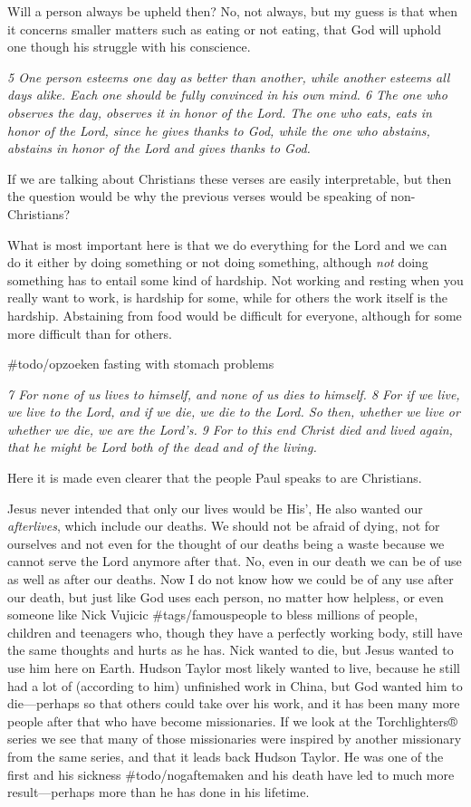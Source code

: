 Will a person always be upheld then? No, not always, but my guess is
that when it concerns smaller matters such as eating or not eating, that
God will uphold one though his struggle with his conscience.

\emph{5 One person esteems one day as better than another, while another
esteems all days alike. Each one should be fully convinced in his own
mind. 6 The one who observes the day, observes it in honor of the Lord.
The one who eats, eats in honor of the Lord, since he gives thanks to
God, while the one who abstains, abstains in honor of the Lord and gives
thanks to God.}

If we are talking about Christians these verses are easily
interpretable, but then the question would be why the previous verses
would be speaking of non-Christians?

What is most important here is that we do everything for the Lord and we
can do it either by doing something or not doing something, although
\emph{not} doing something has to entail some kind of hardship. Not
working and resting when you really want to work, is hardship for some,
while for others the work itself is the hardship. Abstaining from food
would be difficult for everyone, although for some more difficult than
for others.

\#todo/opzoeken fasting with stomach problems

\emph{7 For none of us lives to himself, and none of us dies to himself.
8 For if we live, we live to the Lord, and if we die, we die to the
Lord. So then, whether we live or whether we die, we are the Lord's. 9
For to this end Christ died and lived again, that he might be Lord both
of the dead and of the living.}

Here it is made even clearer that the people Paul speaks to are
Christians.

Jesus never intended that only our lives would be His', He also wanted
our \emph{afterlives}, which include our deaths. We should not be afraid
of dying, not for ourselves and not even for the thought of our deaths
being a waste because we cannot serve the Lord anymore after that. No,
even in our death we can be of use as well as after our deaths. Now I do
not know how we could be of any use after our death, but just like God
uses each person, no matter how helpless, or even someone like Nick
Vujicic \#tags/famouspeople to bless millions of people, children and
teenagers who, though they have a perfectly working body, still have the
same thoughts and hurts as he has. Nick wanted to die, but Jesus wanted
to use him here on Earth. Hudson Taylor most likely wanted to live,
because he still had a lot of (according to him) unfinished work in
China, but God wanted him to die---perhaps so that others could take
over his work, and it has been many more people after that who have
become missionaries. If we look at the Torchlighters® series we see that
many of those missionaries were inspired by another missionary from the
same series, and that it leads back Hudson Taylor. He was one of the
first and his sickness \#todo/nogaftemaken and his death have led to
much more result---perhaps more than he has done in his lifetime.

